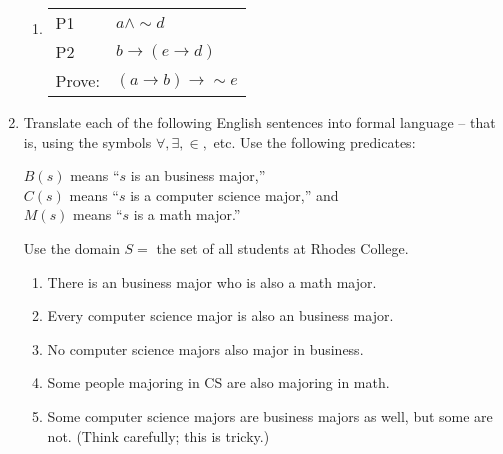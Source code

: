 \documentclass[12pt, letterpaper]{report}
\newcommand{\nott}{{\sim}}
\begin{document}
\begin{enumerate}
\begin{enumerate}
                
                
                \item
                        \begin{tabular}[t]{ll}
                        P1 & $a \land \nott d$ \\
                        P2 & $b \to (e \to d)$ \\ \hline
                        Prove: & $(a \to b) \to \nott e$
                \end{tabular}




\end{enumerate}

        \item Translate each of the following English sentences into formal language -- that is, using the symbols $\forall, \exists, \in,$ etc.  Use the following predicates: 
        
        $B(s)$ means ``$s$ is an business major,'' \\
        $C(s)$ means ``$s$ is a computer science
        major,'' and \\
        $M(s)$ means ``$s$ is a math major.'' 
        
         Use the domain $S = $ the set of
        all students at Rhodes College.
        
        \begin{enumerate}
                \item There is an business major who is also a math major.
                \item Every computer science major is also an business major.
                \item No computer science majors also major in business.
                \item Some people majoring in CS are also majoring in math.
                \item Some computer science majors are business majors as well, but some are not.  (Think carefully; this is tricky.)
        \end{enumerate}
        


\end{enumerate}
\end{document}
